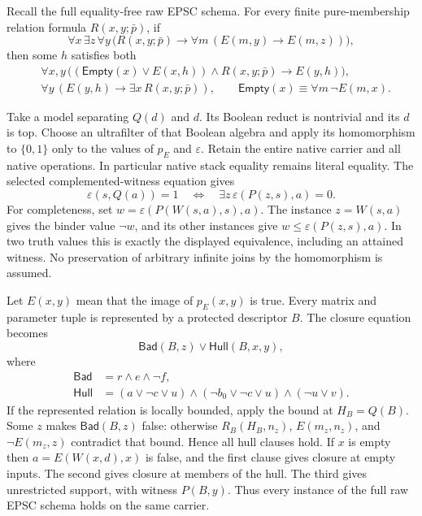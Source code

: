 Recall the full equality-free raw EPSC schema.  For every finite
pure-membership relation formula \(R(x,y;\bar p)\), if
\[
 \forall x\,\exists z\,\forall y\,
       \bigl(R(x,y;\bar p)\longrightarrow
          \forall m\,(E(m,y)\to E(m,z))\bigr),
\]
then some \(h\) satisfies both
\begin{align*}
 &\forall x,y\,
    \bigl((\mathsf{Empty}(x)\lor E(x,h))\land R(x,y;\bar p)
       \longrightarrow E(y,h)\bigr),\\
 &\forall y\,(E(y,h)\longrightarrow\exists x\,R(x,y;\bar p)),
 \qquad \mathsf{Empty}(x)\equiv\forall m\,\neg E(m,x).
\end{align*}

Take a model separating \(Q(d)\) and \(d\).  Its Boolean reduct is
nontrivial and its \(d\) is top.  Choose an ultrafilter of that Boolean
algebra and apply its homomorphism to \(\{0,1\}\) only to the values of
\(p_E\) and \(\varepsilon\).  Retain the entire native carrier and all
native operations.  In particular native stack equality remains literal
equality.  The selected complemented-witness equation gives
\[
 \varepsilon(s,Q(a))=1
       \quad\Longleftrightarrow\quad
       \exists z\,\varepsilon(P(z,s),a)=0.
\]
For completeness, set \(w=\varepsilon(P(W(s,a),s),a)\).  The instance
\(z=W(s,a)\) gives the binder value \(\neg w\), and its other instances
give \(w\leq\varepsilon(P(z,s),a)\).  In two truth values this is exactly
the displayed equivalence, including an attained witness.  No preservation
of arbitrary infinite joins by the homomorphism is assumed.

Let \(E(x,y)\) mean that the image of \(p_E(x,y)\) is true.  Every matrix
and parameter tuple is represented by a protected descriptor \(B\).
The closure equation becomes
\[
 \mathsf{Bad}(B,z)\lor\mathsf{Hull}(B,x,y),
\]
where
\begin{align*}
 \mathsf{Bad}&=r\land e\land\neg f,\\
 \mathsf{Hull}&=(a\lor\neg c\lor u)
                \land(\neg b_0\lor\neg c\lor u)
                \land(\neg u\lor v).
\end{align*}
If the represented relation is locally bounded, apply the bound at
\(H_B=Q(B)\).  Some \(z\) makes \(\mathsf{Bad}(B,z)\) false: otherwise
\(R_B(H_B,n_z)\), \(E(m_z,n_z)\), and \(\neg E(m_z,z)\) contradict
that bound.  Hence all hull clauses hold.  If \(x\) is empty then
\(a=E(W(x,d),x)\) is false, and the first clause gives closure at empty
inputs.  The second gives closure at members of the hull.  The third gives
unrestricted support, with witness \(P(B,y)\).  Thus every instance of
the full raw EPSC schema holds on the same carrier.

